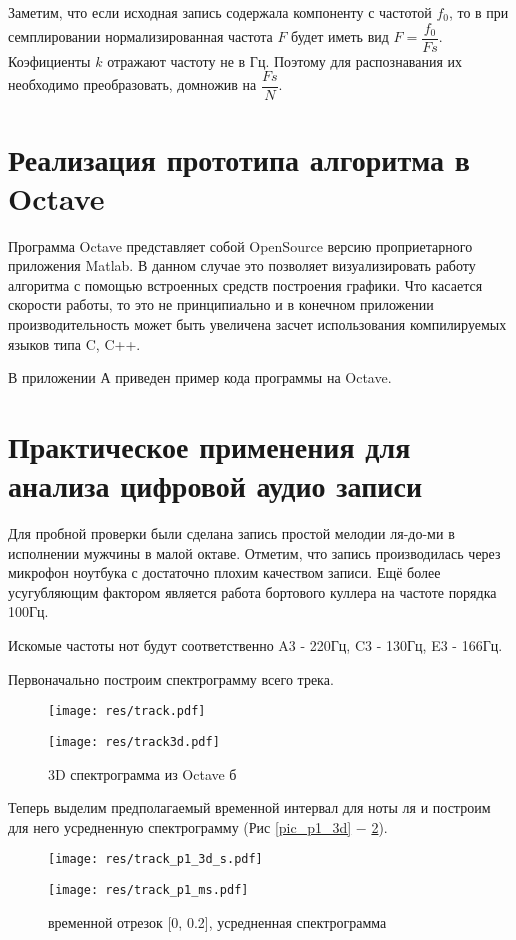 \documentclass[oneside, final, 14pt]{extarticle}
\begin{document}
	Заметим, что если исходная запись содержала компоненту с частотой $f_0$, то
	в при семплировании нормализированная частота $F$ будет иметь вид $F=\dfrac{f_0}{Fs}$.
	Коэфициенты $k$ отражают частоту не в Гц. Поэтому для распознавания их необходимо преобразовать,
	домножив на $\dfrac{Fs}{N}$.

\cleardoublepage
\section{Реализация прототипа алгоритма в Octave}
	Программа Octave представляет собой OpenSource версию проприетарного приложения
	Matlab. В данном случае это позволяет визуализировать работу алгоритма с помощью
	встроенных средств построения графики. Что касается скорости работы, то это не
	принципиально и в конечном приложении производительность может быть увеличена
	засчет использования компилируемых языков типа C, C++.

	В приложении А приведен пример кода программы на Octave.

\cleardoublepage
\section{Практическое применения для анализа цифровой аудио записи}

	Для пробной проверки были сделана запись простой мелодии ля-до-ми в исполнении мужчины
	в малой октаве. Отметим, что запись производилась через микрофон ноутбука с
	достаточно плохим качеством записи. Ещё более усугубляющим фактором является
	работа бортового куллера на частоте порядка 100Гц.

	Искомые частоты нот будут соответственно A3 - 220Гц, C3 - 130Гц, E3 - 166Гц.

	Первоначально построим спектрограмму всего трека.
	\begin{figure}[h]
		\begin{multicols}{2}
			\hfill
			\texttt{[image: res/track.pdf]}
			\hfill
			\caption{3D спектрограмма из Octave а}
			\label{pic_3da}
			\hfill
			\texttt{[image: res/track3d.pdf]}
			\hfill
			\caption{3D спектрограмма из Octave б}
			\label{pic_3db}
		\end{multicols}
	\end{figure}

	Теперь выделим предполагаемый временной интервал для ноты ля и построим
	для него усредненную спектрограмму (Рис \ref{pic_p1_3d} $-$ \ref{pic_p1_ms}).

	\begin{figure}[t]
		\begin{multicols}{2}
			\hfill
			\texttt{[image: res/track\_p1\_3d\_s.pdf]}
			\hfill
			\caption{временной отрезок [0, 0.2], 3D спектрограмма }
			\label{pic_p1_3d}
			\hfill
			\texttt{[image: res/track\_p1\_ms.pdf]}
			\hfill
			\caption{временной отрезок [0, 0.2], усредненная спектрограмма }
			\label{pic_p1_ms}
		\end{multicols}
	\end{figure}
\end{document}
